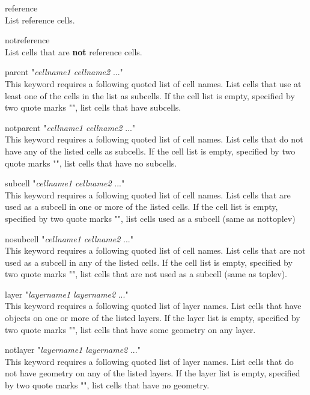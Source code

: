 \begin{description}
\item{\vt reference}\\
List reference cells.
\item{\vt notreference}\\
List cells that are {\bf not} reference cells.

\item{{\vt parent "}{\it cellname1 cellname2} {\vt ..."}}\\
This keyword requires a following quoted list of cell names.  List
cells that use at least one of the cells in the list as subcells.  If
the cell list is empty, specified by two quote marks {\vt ""}, list
cells that have subcells.
\item{{\vt notparent "}{\it cellname1 cellname2} {\vt ..."}}\\
This keyword requires a following quoted list of cell names.  List
cells that do not have any of the listed cells as subcells.  If the
cell list is empty, specified by two quote marks {\vt ""}, list cells
that have no subcells.

\item{{\vt subcell "}{\it cellname1 cellname2} {\vt ..."}}\\
This keyword requires a following quoted list of cell names.  List
cells that are used as a subcell in one or more of the listed cells. 
If the cell list is empty, specified by two quote marks {\vt ""}, list
cells used as a subcell (same as {\vt nottoplev})
\item{{\vt nosubcell "}{\it cellname1 cellname2} {\vt ..."}}\\
This keyword requires a following quoted list of cell names.  List
cells that are not used as a subcell in any of the listed cells.  If
the cell list is empty, specified by two quote marks {\vt ""}, list
cells that are not used as a subcell (same as {\vt toplev}).

\item{{\vt layer "}{\it layername1 layername2} {\vt ..."}}\\
This keyword requires a following quoted list of layer names.  List
cells that have objects on one or more of the listed layers.  If the
layer list is empty, specified by two quote marks {\vt ""}, list cells
that have some geometry on any layer.
\item{{\vt notlayer "}{\it layername1 layername2} {\vt ..."}}\\
This keyword requires a following quoted list of layer names.  List
cells that do not have geometry on any of the listed layers.  If the
layer list is empty, specified by two quote marks {\vt ""}, list cells
that have no geometry.


\end{description}
